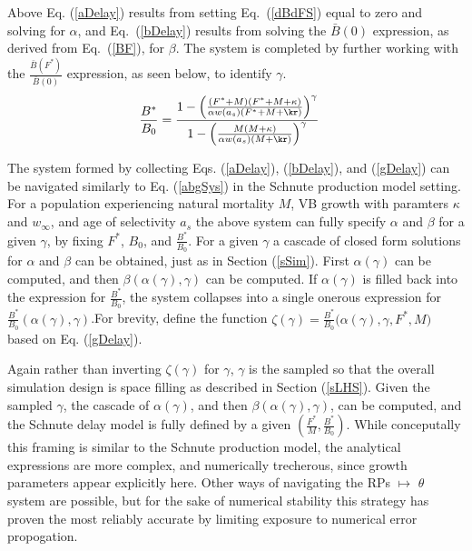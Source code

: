 %
Above Eq. (\ref{aDelay}) results from setting \mbox{Eq. (\ref{dBdFS})} equal to zero 
and solving for $\alpha$, and \mbox{Eq. (\ref{bDelay})} results from solving the 
$\bar{B}(0)$ expression, as derived from \mbox{Eq. (\ref{BF}),} for $\beta$. The system 
is completed by further working with the $\frac{\bar{B}(F^*)}{\bar{B}(0)}$ expression, 
as seen below, to identify $\gamma$.
\begin{align}
\frac{B^*}{B_0} &= \frac{ 1 - \Big(\frac{(F^* + M) (F^* + M + \kappa)}{\alpha w(a_s)(F^* + M + \kr)}\Big)^\gamma }{ 1 - \Big(\frac{M (M + \kappa)}{\alpha w(a_s)(M + \kr)}\Big)^\gamma }
\label{gDelay}
\end{align}

%
The system formed by collecting Eqs. (\ref{aDelay}), (\ref{bDelay}), and 
(\ref{gDelay}) can be navigated similarly to Eq. (\ref{abgSys}) in the Schnute 
production model setting. For a population experiencing natural mortality $M$, 
VB growth with paramters $\kappa$ and $w_\infty$, and age of selectivity $a_s$ 
the above system can fully specify $\alpha$ and $\beta$ for a given $\gamma$, 
by fixing $F^*$, $B_0$, and $\frac{B^*}{B_0}$. For a given $\gamma$ a cascade 
of closed form solutions for $\alpha$ and $\beta$ can be obtained, just as in 
Section (\ref{sSim}). 
%
First $\alpha(\gamma)$ can be computed, and then $\beta(\alpha(\gamma), \gamma)$ 
can be computed. If $\alpha(\gamma)$ is filled back into the expression for 
$\frac{B^*}{B_0}$, the system collapses into a single onerous expression for 
$\frac{B^*}{B_0}(\alpha(\gamma), \gamma)$.For brevity, define the function 
\mbox{$\zeta(\gamma)=\frac{B^*}{B_0}\big(\alpha(\gamma), \gamma, F^*, M\big)$} 
based on Eq. (\ref{gDelay}).

%
Again rather than inverting $\zeta(\gamma)$ for $\gamma$, $\gamma$ is the 
sampled so that the overall simulation design is space filling as described in 
Section (\ref{sLHS}). Given the sampled $\gamma$, the cascade of $\alpha(\gamma)$, 
and then $\beta(\alpha(\gamma), \gamma)$, can be computed, and the Schnute 
delay model is fully defined by a given $(\frac{F^*}{M}, \frac{B^*}{B_0})$.
%
While conceputally this framing is similar to the Schnute production model, 
the analytical expressions are more complex, and numerically trecherous, since 
growth parameters appear explicitly here. Other ways of navigating the RPs $\mapsto$ $\theta$
system are possible, but for the sake of numerical stability this strategy has 
proven the most reliably accurate by limiting exposure to numerical error propogation. 

